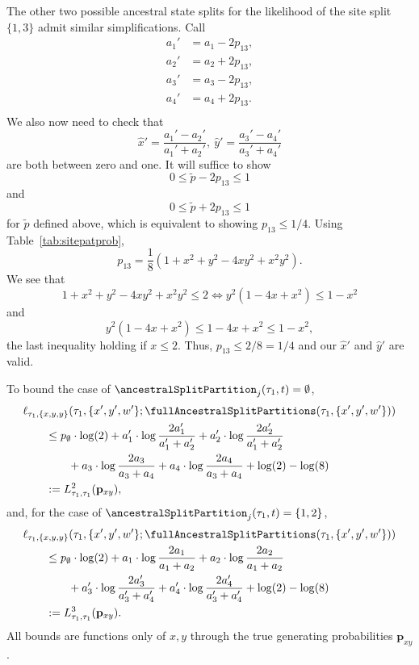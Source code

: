The other two possible ancestral state splits for the likelihood of the site split $\{1,3\}$ admit similar simplifications.
Call
\begin{equation}
    \begin{aligned}
        a_{1}' &= a_{1}-2p_{13}, \\
        a_{2}' &= a_{2}+2p_{13}, \\
        a_{3}' &= a_{3}-2p_{13}, \\
        a_{4}' &= a_{4}+2p_{13}. \\
    \end{aligned}
    \label{eq:a_const_prime}
\end{equation}
We also now need to check that
$$
\hat{x}' = \frac{a_{1}'-a_{2}'}{a_{1}'+a_{2}'}, \ \hat{y}' = \frac{a_{3}'-a_{4}'}{a_{3}'+a_{4}'}
$$
are both between zero and one.
It will suffice to show
$$
0 \le \tilde{p} - 2p_{13} \le 1
$$
and
$$
0 \le \tilde{p} + 2p_{13} \le 1
$$
for $\tilde{p}$ defined above, which is equivalent to showing $p_{13} \le 1/4$.
Using Table~\ref{tab:sitepatprob},
$$
p_{13} = \frac{1}{8}\left(1 + x^2 + y^2 - 4xy^2 + x^2y^2\right).
$$
We see that
$$
1 + x^2 + y^2 - 4xy^2 + x^2y^2 \le 2 \iff y^2\left(1 - 4x + x^2\right) \le 1 - x^2
$$
and
$$
y^2\left(1 - 4x + x^2\right) \le 1 - 4x + x^2 \le 1 - x^2,
$$
the last inequality holding if $x \le 2$.
Thus, $p_{13} \le 2/8 = 1/4$ and our $\hat{x}'$ and $\hat{y}'$ are valid.

To bound the case of $\ancestralSplitPartition_j(\tau_1, t) = \emptyset$,
\begin{align*}
&    \ell_{\tau_1,\{x,y,y\}}(\tau_1, \{x',y',w'\}; \fullAncestralSplitPartitions(\tau_1,\{x',y',w'\})) \\
&\qquad\le      p_{\emptyset}  \cdot\log(2)
+ a_{1}'\cdot\log\frac{2a_{1}'}{a_{1}'+a_{2}'}
+ a_{2}'\cdot\log\frac{2a_{2}'}{a_{1}'+a_{2}'} \\
&\qquad\qquad + a_{3}\cdot\log\frac{2a_{3}}{a_{3}+a_{4}}
+ a_{4}\cdot\log\frac{2a_{4}}{a_{3}+a_{4}}
+ \log(2)
- \log(8) \\
&\qquad := L^{2}_{\tau_1,\tau_1}(\mathbf{p}_{xy}),
\end{align*}
and, for the case of $\ancestralSplitPartition_j(\tau_1, t) = \{1,2\}$,
\begin{align*}
&    \ell_{\tau_1,\{x,y,y\}}(\tau_1, \{x',y',w'\}; \fullAncestralSplitPartitions(\tau_1,\{x',y',w'\})) \\
&\qquad\le      p_{\emptyset}  \cdot\log(2)
+ a_{1}\cdot\log\frac{2a_{1}}{a_{1}+a_{2}}
+ a_{2}\cdot\log\frac{2a_{2}}{a_{1}+a_{2}} \\
&\qquad\qquad+ a_{3}'\cdot\log\frac{2a_{3}'}{a_{3}'+a_{4}'}
+ a_{4}'\cdot\log\frac{2a_{4}'}{a_{3}'+a_{4}'}
+ \log(2)
- \log(8) \\
&\qquad := L^{3}_{\tau_1,\tau_1}(\mathbf{p}_{xy}).
\end{align*}
All bounds are functions only of $x,y$ through the true generating probabilities $\mathbf{p}_{xy}$.


